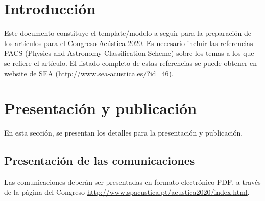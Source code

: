 \documentclass[11pt, a4paper, twoside]{article}
\begin{document}
 \setcounter{page}{1}

\section{Introducción}

Este documento constituye el template/modelo a seguir para la preparación de los artículos para el Congreso Acústica 2020. Es necesario incluir las referencias PACS (Physics and Astronomy Classification Scheme) sobre los temas a los que se refiere el artículo. El listado completo de estas referencias se puede obtener en website de SEA (\url{http://www.sea-acustica.es/?id=46}).


\section{Presentación y publicación}

En esta sección, se presentan los detalles para la presentación y publicación.

\subsection{Presentación de las comunicaciones}

Las comunicaciones deberán ser presentadas en formato electrónico PDF, a través de la página del Congreso \url{http://www.spacustica.pt/acustica2020/index.html}.

\clearpage
\end{document}
